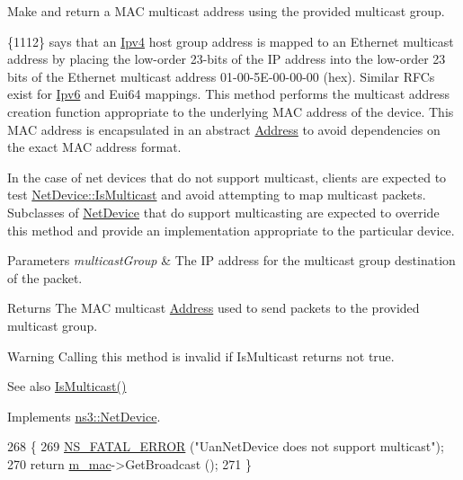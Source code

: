Make and return a M\+AC multicast address using the provided multicast group. 

\{1112\} says that an \hyperlink{classns3_1_1Ipv4}{Ipv4} host group address is mapped to an Ethernet multicast address by placing the low-\/order 23-\/bits of the IP address into the low-\/order 23 bits of the Ethernet multicast address 01-\/00-\/5\+E-\/00-\/00-\/00 (hex). Similar R\+F\+Cs exist for \hyperlink{classns3_1_1Ipv6}{Ipv6} and Eui64 mappings. This method performs the multicast address creation function appropriate to the underlying M\+AC address of the device. This M\+AC address is encapsulated in an abstract \hyperlink{classns3_1_1Address}{Address} to avoid dependencies on the exact M\+AC address format.

In the case of net devices that do not support multicast, clients are expected to test \hyperlink{classns3_1_1NetDevice_a1afb4848a9226540f1ff51f9b31ae95e}{Net\+Device\+::\+Is\+Multicast} and avoid attempting to map multicast packets. Subclasses of \hyperlink{classns3_1_1NetDevice}{Net\+Device} that do support multicasting are expected to override this method and provide an implementation appropriate to the particular device.


\begin{DoxyParams}{Parameters}
{\em multicast\+Group} & The IP address for the multicast group destination of the packet. \\
\hline
\end{DoxyParams}
\begin{DoxyReturn}{Returns}
The M\+AC multicast \hyperlink{classns3_1_1Address}{Address} used to send packets to the provided multicast group.
\end{DoxyReturn}
\begin{DoxyWarning}{Warning}
Calling this method is invalid if Is\+Multicast returns not true. 
\end{DoxyWarning}
\begin{DoxySeeAlso}{See also}
\hyperlink{classns3_1_1UanNetDevice_ad5245f51eb712c75c30d99ac97b3706b}{Is\+Multicast()} 
\end{DoxySeeAlso}


Implements \hyperlink{classns3_1_1NetDevice_a98aa4852df367b6a393c8cc1d88af0d9}{ns3\+::\+Net\+Device}.


\begin{DoxyCode}
268 \{
269   \hyperlink{group__fatal_ga5131d5e3f75d7d4cbfd706ac456fdc85}{NS\_FATAL\_ERROR} (\textcolor{stringliteral}{"UanNetDevice does not support multicast"});
270   \textcolor{keywordflow}{return} \hyperlink{classns3_1_1UanNetDevice_af07aff40dbb010fd62ad0fdcbf394995}{m\_mac}->GetBroadcast ();
271 \}
\end{DoxyCode}
